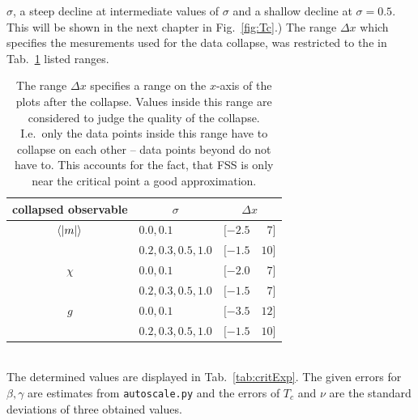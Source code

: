     \(\sigma\), a steep decline at intermediate values of \(\sigma\) and a shallow
    decline at \(\sigma = 0.5\). This will be shown in the next
    chapter in Fig.\ \ref{fig:Tc}.)
    The range \(\Delta x\) which specifies the mesurements used for the
    data collapse, was restricted to the in Tab.\ \ref{tab:FSS_range}
    listed ranges.
    \begin{table}[htbp]
        \center
        \begin{tabular}{c l l@{, }r}
            \toprule
            collapsed observable & \multicolumn{1}{c}{\(\sigma\) }   & \multicolumn{2}{c}{\(\Delta x\)}\\
            \midrule
            \(\left< \left\vert m\right\vert \right>\)    & \(0.0, 0.1\)                      & \([-2.5\) & \( 7]\)\\
                                 & \(0.2, 0.3, 0.5, 1.0\)           & \([-1.5\) & \(10]\)\\
            \(\chi\)             & \(0.0, 0.1\)                      & \([-2.0\) & \( 7]\)\\
                                 & \(0.2, 0.3, 0.5, 1.0\)           & \([-1.5\) & \( 7]\)\\
            \(g\)                & \(0.0, 0.1\)                      & \([-3.5\) & \(12]\)\\
                                 & \(0.2, 0.3, 0.5, 1.0\)           & \([-1.5\) & \(10]\)\\
            \bottomrule
        \end{tabular}
        \caption[Ranges of the Data Collapse]{
            The range \(\Delta x\) specifies a range on the \(x\)-axis of
            the plots after the collapse. Values inside this range are
            considered to judge the quality of the collapse. I.e.\ only
            the data points inside this range have to collapse on each
            other -- data points beyond do not have to. This accounts
            for the fact, that FSS is only near the critical point a good
            approximation.
        }
        \label{tab:FSS_range}
    \end{table}\\
    The determined values are displayed in Tab.\ \ref{tab:critExp}.
    The given errors for \(\beta, \gamma\) are estimates from \texttt{autoscale.py}
    and the errors of \(T_c\) and \(\nu\) are the standard deviations of
    three obtained values.\\
